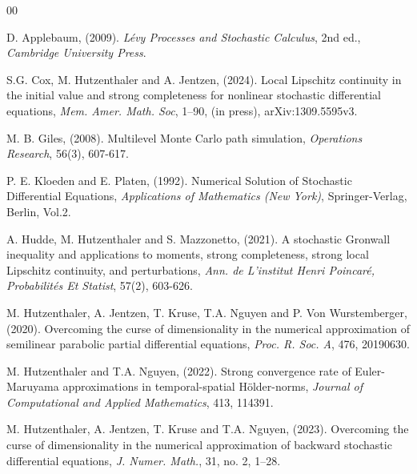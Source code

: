 \documentclass[11pt]{article}
\theoremstyle{theorem}
\theoremstyle{definition}
\newcommand{\1}{{\bf 1}}
\begin{document}
\begin{thebibliography}{00}

D. Applebaum, (2009). \emph{L\'evy  Processes and Stochastic Calculus}, 2nd ed., \emph{Cambridge University Press}.
    
S.G. Cox, M. Hutzenthaler and A. Jentzen, (2024). Local Lipschitz continuity in the initial value and strong completeness for nonlinear stochastic differential equations, \emph{Mem. Amer. Math. Soc}, 1–90, (in press), arXiv:1309.5595v3.




M. B. Giles, (2008). Multilevel Monte Carlo path simulation, \emph{Operations Research}, 56(3), 607-617.

P. E. Kloeden and E. Platen, (1992). Numerical Solution of Stochastic Differential Equations, \emph{Applications of Mathematics (New York)}, Springer-Verlag, Berlin, Vol.2.

A. Hudde, M. Hutzenthaler and S. Mazzonetto, (2021). A stochastic Gronwall inequality and applications to moments, strong completeness, strong local Lipschitz continuity, and perturbations, \emph{Ann. de L'institut Henri Poincar\'e, Probabilit\'es Et Statist}, 57(2), 603-626.

M. Hutzenthaler, A. Jentzen, T. Kruse, T.A. Nguyen and P. Von Wurstemberger, (2020). Overcoming the curse of dimensionality in the numerical approximation of semilinear parabolic partial differential equations, \emph{Proc. R. Soc. A}, 476, 20190630.

M. Hutzenthaler and T.A. Nguyen, (2022). Strong convergence rate of Euler-Maruyama approximations in temporal-spatial H\"older-norms, \emph{Journal of Computational and Applied Mathematics}, 413, 114391.

M. Hutzenthaler, A. Jentzen, T. Kruse and T.A. Nguyen, (2023). Overcoming the curse of dimensionality in the numerical approximation of backward stochastic differential equations, \emph{J. Numer. Math.}, 31, no. 2, 1–28.



\end{thebibliography}
\end{document}

